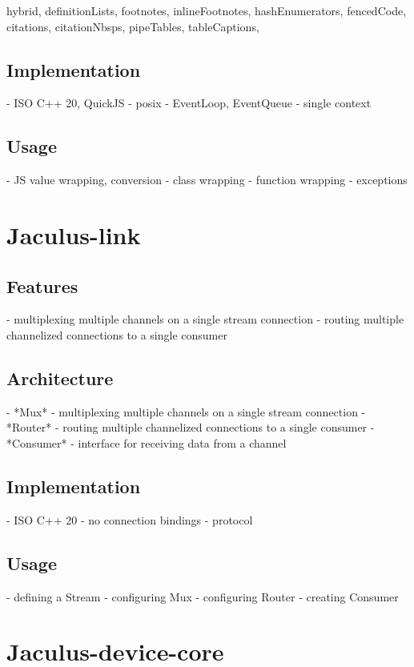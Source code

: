 \documentclass[
  digital,
  oneside,
  nosansbold,
  nocolorbold,
  lof,
  lot
]{fithesis4}
\begin{document}
\begin{markdown*}{%
  hybrid,
  definitionLists,
  footnotes,
  inlineFootnotes,
  hashEnumerators,
  fencedCode,
  citations,
  citationNbsps,
  pipeTables,
  tableCaptions,
}
\section{Implementation}

- ISO C++ 20, QuickJS - posix
- EventLoop, EventQueue
- single context

\section{Usage}

  - JS value wrapping, conversion
  - class wrapping
  - function wrapping
  - exceptions

\chapter{Jaculus-link}

\section{Features}

  - multiplexing multiple channels on a single stream connection
  - routing multiple channelized connections to a single consumer

\section{Architecture}

  - *Mux* - multiplexing multiple channels on a single stream connection
  - *Router* - routing multiple channelized connections to a single consumer
  - *Consumer* - interface for receiving data from a channel

\section{Implementation}

  - ISO C++ 20
  - no connection bindings
  - protocol

\section{Usage}

  - defining a Stream
  - configuring Mux
  - configuring Router
  - creating Consumer


\chapter{Jaculus-device-core}


\end{markdown*}
\end{document}
